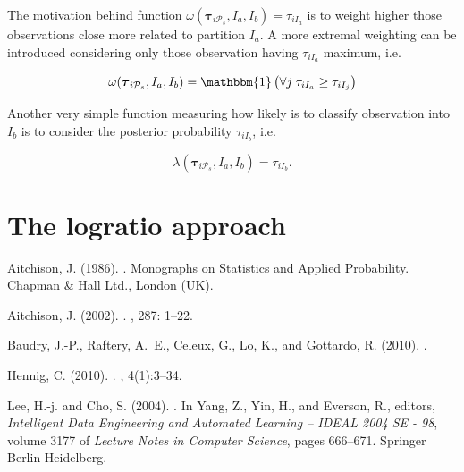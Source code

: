 \documentclass[10pt, a4paper]{article}
\newcommand{\m}[1]{\boldsymbol{#1}}
\begin{document}
\begin{spacing}{1.9}
The motivation behind function $\omega(\m\tau_{i \mathcal{P}_s},  I_a,  I_b) = \tau_{iI_a}$ is to weight higher those observations close more related to partition $I_a$. A more extremal weighting can be introduced considering only those observation having $ \tau_{iI_a}$ maximum, i.e.

\[
\omega(\m\tau_{i \mathcal{P}_s},  I_a,  I_b) = \mathbbm{1}\left( \forall j\; \tau_{i I_{a}} \geq \tau_{iI_j} \right)
\]

Another very simple function measuring how likely is to classify observation into $I_b$ is to consider the posterior probability $\tau_{i I_{b}}$, i.e.

\[
\lambda(\m\tau_{i \mathcal{P}_s},  I_a,  I_b) = \tau_{iI_b}.
\]

\section{The logratio approach}

\newpage


\begin{thebibliography}{}

Aitchison, J. (1986).
.
\newblock Monographs on Statistics and Applied Probability. Chapman \& Hall
  Ltd., London (UK).

Aitchison, J. (2002).
.
, 287: 1--22.

Baudry, J.-P., Raftery, A.~E., Celeux, G., Lo, K., and Gottardo, R. (2010).
.

Hennig, C. (2010).
.
, 4(1):3--34.

Lee, H.-j. and Cho, S. (2004).
.
\newblock In Yang, Z., Yin, H., and Everson, R., editors, {\em Intelligent Data
  Engineering and Automated Learning – IDEAL 2004 SE - 98}, volume 3177 of
  {\em Lecture Notes in Computer Science}, pages 666--671. Springer Berlin
  Heidelberg.


\end{thebibliography}
\end{spacing}
\end{document}
